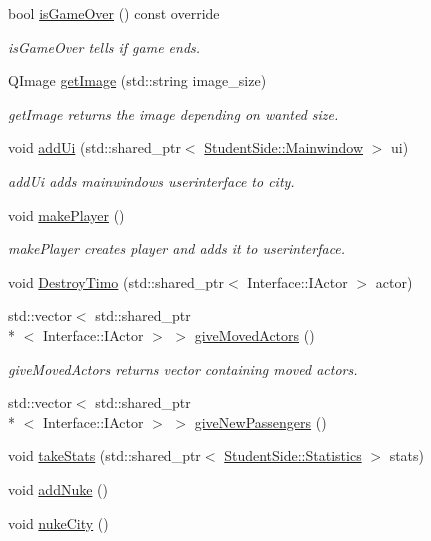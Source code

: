 \begin{DoxyCompactItemize}
bool \hyperlink{class_student_side_1_1_city_a9ca889641234d84e92fa97b999ae1ee4}{is\-Game\-Over} () const override
\begin{DoxyCompactList}\small\item\em is\-Game\-Over tells if game ends. \end{DoxyCompactList}\item 
Q\-Image \hyperlink{class_student_side_1_1_city_ab3ac8687f8213b2a26484214a7925dc2}{get\-Image} (std\-::string image\-\_\-size)
\begin{DoxyCompactList}\small\item\em get\-Image returns the image depending on wanted size. \end{DoxyCompactList}\item 
void \hyperlink{class_student_side_1_1_city_a5d7dffa807359354d94bd031fb207767}{add\-Ui} (std\-::shared\-\_\-ptr$<$ \hyperlink{class_student_side_1_1_mainwindow}{Student\-Side\-::\-Mainwindow} $>$ ui)
\begin{DoxyCompactList}\small\item\em add\-Ui adds mainwindows userinterface to city. \end{DoxyCompactList}\item 
void \hyperlink{class_student_side_1_1_city_a9e77dd00ce37d3467bb078d0fb7b3cca}{make\-Player} ()
\begin{DoxyCompactList}\small\item\em make\-Player creates player and adds it to userinterface. \end{DoxyCompactList}\item 
void \hyperlink{class_student_side_1_1_city_a3f0375a49769a2a3456853a354732efe}{Destroy\-Timo} (std\-::shared\-\_\-ptr$<$ Interface\-::\-I\-Actor $>$ actor)
\item 
std\-::vector$<$ std\-::shared\-\_\-ptr\\*
$<$ Interface\-::\-I\-Actor $>$ $>$ \hyperlink{class_student_side_1_1_city_ab12fa6213daf693fc5602317c04c363c}{give\-Moved\-Actors} ()
\begin{DoxyCompactList}\small\item\em give\-Moved\-Actors returns vector containing moved actors. \end{DoxyCompactList}\item 
std\-::vector$<$ std\-::shared\-\_\-ptr\\*
$<$ Interface\-::\-I\-Actor $>$ $>$ \hyperlink{class_student_side_1_1_city_a2e0283747d6ad3d03b445d9def9780cb}{give\-New\-Passengers} ()
\item 
void \hyperlink{class_student_side_1_1_city_a4030f4a976670a9d33b990f2c7d1f11c}{take\-Stats} (std\-::shared\-\_\-ptr$<$ \hyperlink{class_student_side_1_1_statistics}{Student\-Side\-::\-Statistics} $>$ stats)
\item 
void \hyperlink{class_student_side_1_1_city_a8daa819e3acf9ce4c7a51e2dd6d53895}{add\-Nuke} ()
\item 
void \hyperlink{class_student_side_1_1_city_af81fc684dc3cdc743d8a267e0de37f7b}{nuke\-City} ()
\end{DoxyCompactItemize}


